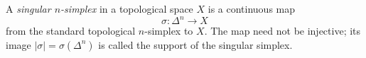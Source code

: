 
A \emph{singular $n$-simplex} in a topological space $X$ is a continuous map
\[
\sigma:\Delta^n\to X
\]
from the standard topological $n$-simplex to $X$. The map need not be injective; its image $|\sigma|=\sigma(\Delta^n)$ is called the support of the singular simplex.
